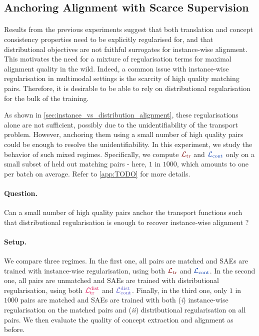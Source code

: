 \documentclass{article}
\begin{document}
\subsection{Anchoring Alignment with Scarce Supervision}
\label{sec:anchoring}

\paragraph{}Results from the previous experiments suggest that both translation and concept consistency properties need to be explicitly regularised for, and that distributional objectives are not faithful surrogates for instance-wise alignment. This motivates the need for a mixture of regularisation terms for maximal alignment quality in the wild. Indeed, a common issue with instance-wise regularisation in multimodal settings is the scarcity of high quality matching pairs. Therefore, it is desirable to be able to rely on distributional regularisation for the bulk of the training.

As shown in \cref{sec:instance_vs_distribution_alignment}, these regularisations alone are not sufficient, possibly due to the unidentifiability of the transport problem. However, anchoring them using a small number of high quality pairs could be enough to resolve the unidentifiability. In this experiment, we study the behavior of such mixed regimes. Specifically, we compute $\Ltr$ and $\Lcont$ only on a small subset of held out matching pairs - here, $1$ in $1000$, which amounts to one per batch on average. Refer to \cref{app:TODO} for more details.

\paragraph{Question.} Can a small number of high quality pairs anchor the transport functions such that distributional regularisation is enough to recover instance-wise alignment ?
\paragraph{Setup.} We compare three regimes. In the first one, all pairs are matched and SAEs are trained with instance-wise regularisation, using both $\Ltr$ and $\Lcont$. In the second one, all pairs are unmatched and SAEs are trained with distributional regularisation, using both $\Ltrdist$ and $\Lcontdist$. Finally, in the third one, only $1$ in $1000$ pairs are matched and SAEs are trained with both (\emph{i}) instance-wise regularisation on the matched pairs and (\emph{ii}) distributional regularisation on all pairs. We then evaluate the quality of concept extraction and alignment as before.
\end{document}
